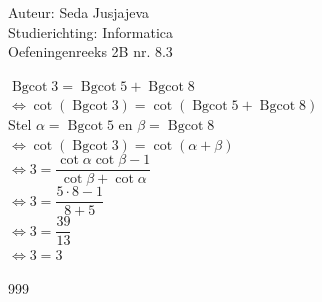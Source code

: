 \documentclass[a4paper]{article}
\newcommand{\Bgcot}{\operatorname{Bgcot}}
\begin{document}
\noindent \large Auteur: Seda Jusjajeva\\
\noindent \large Studierichting: Informatica\\
\noindent \large Oefeningenreeks 2B nr. 8.3 \\

\medskip

\normalsize

$\Bgcot 3 = \Bgcot 5 + \Bgcot 8$ \\

$\Leftrightarrow \cot(\Bgcot 3) = \cot(\Bgcot 5 + \Bgcot 8)$ \\

Stel $\alpha = \Bgcot 5 $ en $\beta = \Bgcot 8$ \\

$\Leftrightarrow \cot(\Bgcot 3) = \cot(\alpha + \beta)$ \\

$\Leftrightarrow 3 = \dfrac{\cot\alpha\cot\beta -1}{\cot\beta + \cot\alpha}$ \\

$\Leftrightarrow 3 = \dfrac{5\cdot8 -1}{8 + 5}$ \\

$\Leftrightarrow 3 = \dfrac{39}{13}$ \\

$\Leftrightarrow 3 = 3$ \\



\begin{thebibliography}{999}
\end{thebibliography}
\end{document}

